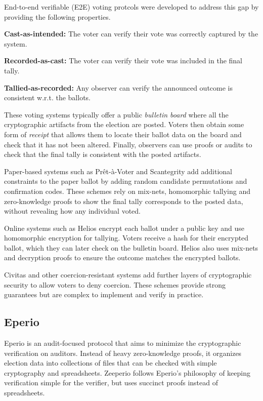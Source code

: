 \documentclass{llncs}
\begin{document}
End-to-end verifiable (E2E) voting protcols were developed to address this gap by providing the following properties.
\begin{description}
  \item \textbf{Cast-as-intended:} The voter can verify their vote was correctly captured by the system.
  \item \textbf{Recorded-as-cast:} The voter can verify their vote was included in the final tally.
  \item \textbf{Tallied-as-recorded:} Any observer can verify the announced outcome is consistent w.r.t. the ballots.
\end{description}

These voting systems typically offer a public \emph{bulletin board} where all the cryptographic artifacts from the election are posted.
Voters then obtain some form of \emph{receipt} that allows them to locate their ballot data on the board and check that it has not been altered.
Finally, observers can use proofs or audits to check that the final tally is consistent with the posted artifacts.

Paper-based systems such as Pr{\^e}t-\`a-Voter and Scantegrity add additional constraints to the paper ballot by adding random candidate permutations and confirmation codes.
These schemes rely on mix-nets, homomorphic tallying and zero-knowledge proofs to show the final tally corresponds to the posted data, without revealing how any individual voted.

Online systems such as Helios encrypt each ballot under a public key and use homomorphic encryption for tallying.
Voters receive a hash for their encrypted ballot, which they can later check on the bulletin board.
Helios also uses mix-nets and decryption proofs to ensure the outcome matches the encrypted ballots.

Civitas and other coercion-resistant systems add further layers of cryptographic security to allow voters to deny coercion. These schemes provide strong guarantees but are complex to implement and verify in practice.

\subsection{Eperio}

Eperio is an audit-focused protocol that aims to minimize the cryptographic verification on auditors.
Instead of heavy zero-knowledge proofs, it organizes election data into collections of files that can be checked with simple cryptography and spreadsheets.
Zeeperio follows Eperio's philosophy of keeping verification simple for the verifier, but uses succinct proofs instead of spreadsheets.
\end{document}
